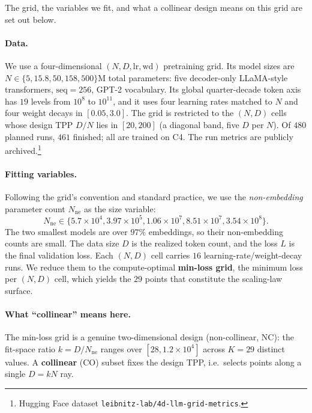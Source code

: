\documentclass[11pt]{article}
\newcommand{\defn}[1]{\textbf{#1}}
\begin{document}
The grid, the variables we fit, and what a collinear design means on this grid are set out below.

\paragraph{Data.} We use a four-dimensional $(N,D,\text{lr},\text{wd})$ pretraining grid. Its model
sizes are $N\in\{5,\allowbreak 15.8,\allowbreak 50,\allowbreak 158,\allowbreak 500\}$M total parameters: five decoder-only LLaMA-style
transformers, $\mathrm{seq}=256$, GPT-2 vocabulary. Its global quarter-decade token axis has
$19$ levels from $10^{8}$ to $10^{11}$, and it uses four learning rates matched to $N$ and four
weight decays in $[0.05,3.0]$. The grid is restricted to the $(N,D)$ cells whose design TPP $D/N$ lies in
$[20,200]$ (a diagonal band, five $D$ per $N$). Of $480$ planned runs, $461$ finished; all are trained on C4. The run metrics are
publicly archived.\footnote{Hugging Face dataset \texttt{leibnitz-lab/4d-llm-grid-metrics}.}

\paragraph{Fitting variables.} Following the grid's convention and standard practice, we use the
\emph{non-embedding} parameter count $N_{\text{ne}}$ as the size variable:
\begin{equation*}
  N_{\text{ne}}\in\{5.7\times10^{4},3.97\times10^{5},1.06\times10^{7},8.51\times10^{7},3.54\times10^{8}\}.
\end{equation*}
The two smallest models are over $97\%$ embeddings, so their non-embedding counts are small. The
data size $D$ is the realized token count, and the loss $L$ is the final validation loss. Each $(N,D)$ cell
carries $16$ learning-rate/weight-decay runs. We reduce them to the compute-optimal
\defn{min-loss grid}, the minimum loss per $(N,D)$ cell, which yields the $29$ points that
constitute the scaling-law surface.

\paragraph{What ``collinear'' means here.} The min-loss grid is a genuine two-dimensional design
(non-collinear, NC): the fit-space ratio $k=D/N_{\text{ne}}$ ranges over $[28,1.2\times10^{4}]$
across $K=29$ distinct values. A \defn{collinear} (CO) subset fixes the design TPP, i.e.\ selects
points along a single $D=kN$ ray.
\end{document}
